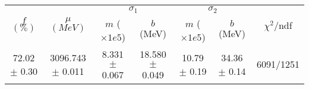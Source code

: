 \begin{tabular}{c|c|cc|cc||c}
 \multirow{2}{*}{$f$ $(\%)$} & \multirow{2}{*}{$\mu$ $(MeV)$} & \multicolumn{2}{|c|}{$\sigma_1$} & \multicolumn{2}{|c||}{$\sigma_2$} & \multirow{2}{*}{$\chi^2/$ndf} \\
 & & $m$ ($\times1e5$) & $b$ (MeV) & $m$ ($\times1e5$) & $b$ (MeV) & \\
\hline
72.02 $\pm$ 0.30 & 3096.743 $\pm$ 0.011 & 8.331 $\pm$ 0.067 & 18.580 $\pm$ 0.049 & 10.79 $\pm$ 0.19 & 34.36 $\pm$ 0.14 & 6091/1251\\
\end{tabular}
